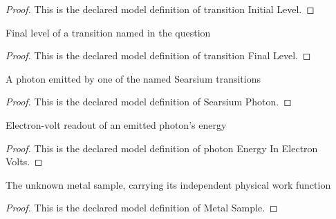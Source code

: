 \begin{proof}
  This is the declared model definition of transition Initial Level.
\end{proof}
\begin{definition}
  \label{def:physics:phyx-mini-0518:phyxminiproblems-problemphyxmini0518-transitionfinallevel}
  Final level of a transition named in the question
\end{definition}
\begin{proof}
  This is the declared model definition of transition Final Level.
\end{proof}
\begin{definition}
  \label{def:physics:phyx-mini-0518:phyxminiproblems-problemphyxmini0518-searsiumphoton}
  A photon emitted by one of the named Searsium transitions
\end{definition}
\begin{proof}
  This is the declared model definition of Searsium Photon.
\end{proof}
\begin{definition}
  \label{def:physics:phyx-mini-0518:phyxminiproblems-problemphyxmini0518-photonenergyinelectronvolts}
  Electron-volt readout of an emitted photon's energy
\end{definition}
\begin{proof}
  This is the declared model definition of photon Energy In Electron Volts.
\end{proof}
\begin{definition}
  \label{def:physics:phyx-mini-0518:phyxminiproblems-problemphyxmini0518-metalsample}
  The unknown metal sample, carrying its independent physical work function
\end{definition}
\begin{proof}
  This is the declared model definition of Metal Sample.
\end{proof}
